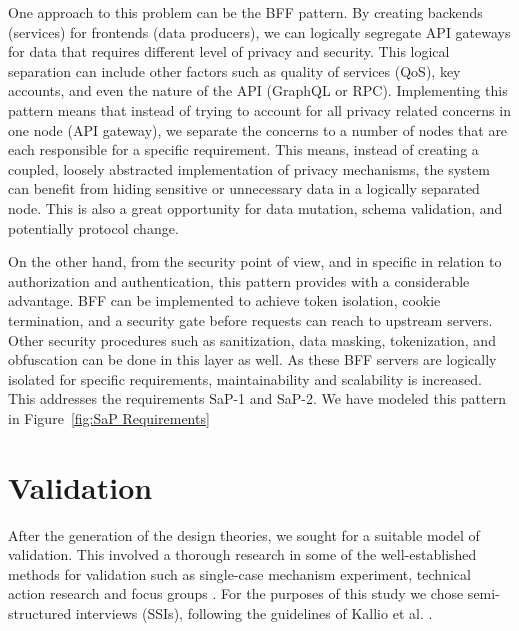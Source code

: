 \documentclass{bmcart}
\begin{document}
One approach to this problem can be the BFF pattern. By creating backends (services) for frontends (data producers), we can logically segregate API gateways for data that requires different level of privacy and security. This logical separation can include other factors such as quality of services (QoS), key accounts, and even the nature of the API (GraphQL or RPC). Implementing this pattern means that instead of trying to account for all privacy related concerns in one node (API gateway), we separate the concerns to a number of nodes that are each responsible for a specific requirement. This means, instead of creating a coupled, loosely abstracted implementation of privacy mechanisms, the system can benefit from hiding sensitive or unnecessary data in a logically separated node. This is also a great opportunity for data mutation, schema validation, and potentially protocol change.

On the other hand, from the security point of view, and in specific in relation to authorization and authentication, this pattern provides with a considerable advantage. BFF can be implemented to achieve token isolation, cookie termination, and a security gate before requests can reach to upstream servers. Other security procedures such as sanitization, data masking, tokenization, and obfuscation can be done in this layer as well. As these BFF servers are logically isolated for specific requirements, maintainability and scalability is increased. This addresses the requirements SaP-1 and SaP-2. We have modeled this pattern in Figure~\ref{fig:SaP Requirements}



\section{Validation}

After the generation of the design theories, we sought for a suitable model of validation. This involved a thorough research in some of the well-established methods for validation such as single-case mechanism experiment, technical action research and focus groups \cite{wieringa2014design}. For the purposes of this study we chose semi-structured interviews (SSIs), following the guidelines of Kallio et al. \cite{kallio2016systematic}. 
\end{document}
